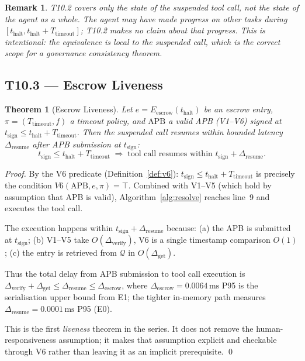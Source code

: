 \documentclass[11pt]{article}
\newtheorem{theorem}{Theorem}[section]
\newtheorem{remark}{Remark}[section]
\newcommand{\APB}{\mathrm{APB}}
\newcommand{\Dverify}{\Delta_{\mathrm{verify}}}
\newcommand{\Eescrow}{E_{\mathrm{escrow}}}
\newcommand{\thalt}{t_{\mathrm{halt}}}
\newcommand{\tsign}{t_{\mathrm{sign}}}
\newcommand{\Ttimeout}{T_{\mathrm{timeout}}}
\newcommand{\Drescrow}{\Delta_{\mathrm{escrow}}}
\newcommand{\Dresume}{\Delta_{\mathrm{resume}}}
\newcommand{\Queue}{\mathcal{Q}}
\begin{document}
\begin{remark}
T10.2 covers only the state of the suspended \emph{tool call}, not the
state of the agent as a whole. The agent may have made progress on
other tasks during $[\thalt, \thalt + \Ttimeout]$; T10.2 makes no
claim about that progress. This is intentional: the equivalence is
local to the suspended call, which is the correct scope for a
governance consistency theorem.
\end{remark}

\subsection{T10.3 --- Escrow Liveness}

\begin{theorem}[Escrow Liveness]
\label{thm:liveness}
Let $e = \Eescrow(\thalt)$ be an escrow entry, $\pi = (\Ttimeout, f)$
a timeout policy, and $\APB$ a valid APB (V1--V6) signed at
$\tsign \le \thalt + \Ttimeout$.  Then the suspended call resumes
within bounded latency $\Dresume$ after APB submission at $\tsign$:
\[
  \tsign \le \thalt + \Ttimeout
  \;\Longrightarrow\;
  \text{tool call resumes within } \tsign + \Dresume.
\]
\end{theorem}

\begin{proof}
By the V6 predicate (Definition~\ref{def:v6}):
$\tsign \le \thalt + \Ttimeout$ is precisely the condition $V6(\APB, e,
\pi) = \top$.  Combined with V1--V5 (which hold by assumption that
$\APB$ is valid), Algorithm~\ref{alg:resolve} reaches line~9 and
executes the tool call.

The execution happens within $\tsign + \Dresume$ because:
(a) the APB is submitted at $\tsign$;
(b) V1--V5 take $O(\Dverify)$, V6 is a single timestamp comparison
    $O(1)$;
(c) the entry is retrieved from $\Queue$ in $O(\Delta_{\mathrm{get}})$.

Thus the total delay from APB submission to tool call execution is
$\Dverify + \Delta_{\mathrm{get}} \le \Dresume \le \Drescrow$, where
$\Drescrow = 0.0064\,\si{\milli\second}$ P95 is the serialisation
upper bound from E1; the tighter in-memory path measures
$\Dresume = 0.0001\,\si{\milli\second}$ P95 (E0).

This is the first \emph{liveness} theorem in the series. It does not
remove the human-responsiveness assumption; it makes that assumption
explicit and checkable through V6 rather than leaving it as an
implicit prerequisite.
\qed
\end{proof}
\end{document}
